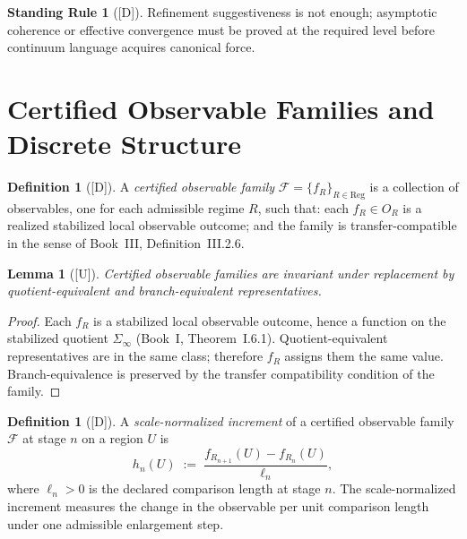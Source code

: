 \documentclass[12pt,oneside]{amsbook}
\theoremstyle{plain}
\newtheorem{lemma}[theorem]{Lemma}
\theoremstyle{definition}
\newtheorem{definition}[theorem]{Definition}
\newtheorem{standingrule}[theorem]{Standing Rule}
\theoremstyle{remark}
\newcommand{\status}[1]{\textup{[#1]}}
\begin{document}
\begin{standingrule}[\status{D}]\label{sr:no-asymptotic-promotion}
Refinement suggestiveness is not enough; asymptotic coherence or
effective convergence must be proved at the required level before
continuum language acquires canonical force.
\end{standingrule}

\section{Certified Observable Families and Discrete Structure}

\begin{definition}[\status{D}]\label{def:cert-obs-family}
A \emph{certified observable family} $\mathcal{F} = \{f_R\}_{R \in
\mathrm{Reg}}$ is a collection of observables, one for each admissible
regime $R$, such that: each $f_R \in O_R$ is a realized stabilized
local observable outcome; and the family is transfer-compatible in the
sense of Book~III, Definition~III.2.6.
\end{definition}

\begin{lemma}[\status{U}]\label{lem:cert-fam-quotient-inv}
Certified observable families are invariant under replacement by
quotient-equivalent and branch-equivalent representatives.
\end{lemma}

\begin{proof}
Each $f_R$ is a stabilized local observable outcome, hence a function
on the stabilized quotient $\Sigma_\infty$ (Book~I, Theorem~I.6.1).
Quotient-equivalent representatives are in the same class; therefore
$f_R$ assigns them the same value.  Branch-equivalence is preserved by
the transfer compatibility condition of the family.
\end{proof}

\begin{definition}[\status{D}]\label{def:scale-norm-increment}
A \emph{scale-normalized increment} of a certified observable family
$\mathcal{F}$ at stage $n$ on a region $U$ is
\[
  h_n(U) \;:=\; \frac{f_{R_{n+1}}(U) - f_{R_n}(U)}{\ell_n},
\]
where $\ell_n > 0$ is the declared comparison length at stage $n$.
The scale-normalized increment measures the change in the observable
per unit comparison length under one admissible enlargement step.
\end{definition}
\end{document}
